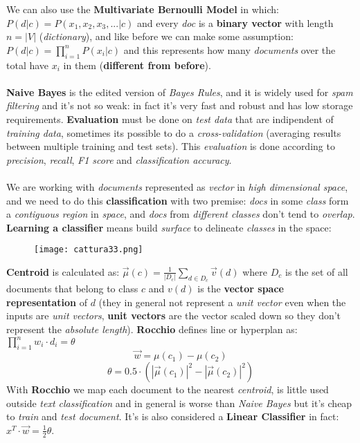\documentclass{article}
\begin{document}
We can also use the \textbf{Multivariate Bernoulli Model} in which: $P(d|c) = P(x_1, x_2, x_3,... | c)$ and every \emph{doc} is a \textbf{binary vector} with length $n=|V|$ (\emph{dictionary}), and like before we can make some assumption: $P(d|c) = \prod_{i=1}^{n} P(x_i | c)$ and this represents how many \emph{documents} over the total have $x_i$ in them (\textbf{different from before}). \\\\
\textbf{Naive Bayes} is the edited version of \emph{Bayes Rules}, and it is widely used for \emph{spam filtering} and it's not so weak: in fact it's very fast and robust and has low storage requirements. \textbf{Evaluation} must be done on \emph{test data} that are indipendent of \emph{training data}, sometimes its possible to do a \emph{cross-validation} (averaging results between multiple training and test sets). This \emph{evaluation} is done according to \emph{precision}, \emph{recall}, \emph{F1 score} and \emph{classification accuracy}. \\\\
We are working with \emph{documents} represented as \emph{vector} in \emph{high dimensional space}, and we need to do this \textbf{classification} with two premise: \emph{docs} in some \emph{class} form a \emph{contiguous region} in \emph{space}, and \emph{docs} from \emph{different classes} don't tend to \emph{overlap}. \textbf{Learning a classifier} means build \emph{surface} to delineate \emph{classes} in the space:
\begin{figure}[H]
  \centering
  \texttt{[image: cattura33.png]}
\end{figure}
\textbf{Centroid} is calculated as: $\vec{\mu}(c) = \frac{1}{|D_c|}\sum_{d \in D_c} \vec{v}(d)$ where $D_c$ is the set of all documents that belong to class $c$ and $v(d)$ is the \textbf{vector space representation} of $d$ (they in general not represent a \emph{unit vector} even when the inputs are \emph{unit vectors}, \textbf{unit vectors} are the vector scaled down so they don't represent the \emph{absolute length}). \textbf{Rocchio} defines line or hyperplan as: $\prod_{i=1}^{n} w_i \cdot d_i = \theta$
\[\vec{w} = \mu(c_1) - \mu(c_2)\]
\[\theta = 0.5 \cdot (|\vec{\mu}(c_1)|^2 - |\vec{\mu}(c_2)|^2)\]
With \textbf{Rocchio} we map each document to the nearest \emph{centroid}, is little used outside \emph{text classification} and in general is worse than \emph{Naive Bayes} but it's cheap to \emph{train} and \emph{test document}. It's is also considered a \textbf{Linear Classifier} in fact: $x^T \cdot \vec{w} = \frac{1}{2}\theta$. \\\\
\end{document}
